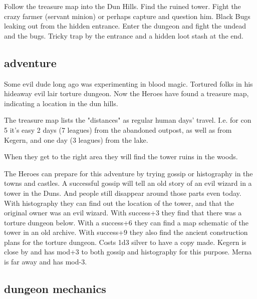 Follow the treasure map into the Dun Hills. Find the ruined tower. Fight the crazy farmer (servant minion) or perhaps capture and question him. Black Bugs leaking out from the hidden entrance. Enter the dungeon and fight the undead and the bugs. Tricky trap by the entrance and a hidden loot stash at the end.


\subsection*{adventure}

Some evil dude long ago was experimenting in blood magic. Tortured folks in his hideaway evil lair torture dungeon. Now the Heroes have found a treasure map, indicating a location in the dun hills.

The treasure map lists the "distances" as regular human days' travel. I.e. for con 5 it's easy 2 days (7 leagues) from the abandoned outpost, as well as from Kegern, and one day (3 leagues) from the lake.

When they get to the right area they will find the tower ruins in the woods.

The Heroes can prepare for this adventure by trying gossip or histography in the towns and castles. A successful gossip will tell an old story of an evil wizard in a tower in the Duns. And people still disappear around those parts even today. With histography they can find out the location of the tower, and that the original owner was an evil wizard. With success+3 they find that there was a torture dungeon below. With a success+6 they can find a map schematic of the tower in an old archive. With success+9 they also find the ancient construction plans for the torture dungeon. Costs 1d3 silver to have a copy made. Kegern is close by and has mod+3 to both gossip and histography for this purpose. Merna is far away and has mod-3.


\subsection*{dungeon mechanics}

